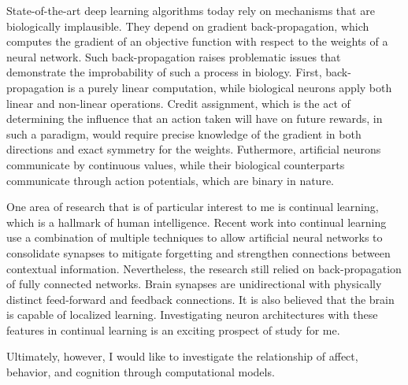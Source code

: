 \documentclass[12pt]{article}
\begin{document}
State-of-the-art deep learning algorithms today rely on mechanisms that are
biologically implausible.  They depend on gradient back-propagation, which
computes the gradient of an objective function with respect to the weights of a
neural network.  Such back-propagation raises problematic issues that
demonstrate the improbability of such a process in biology.  First,
back-propagation is a purely linear computation, while biological neurons apply
both linear and non-linear operations. Credit assignment, which is the act of
determining the influence that an action taken will have on future rewards, in
such a paradigm, would require precise knowledge of the gradient in both
directions and exact symmetry for the weights.  Futhermore, artificial neurons
communicate by continuous values, while their biological counterparts
communicate through action potentials, which are binary in nature.  

One
area of research that is of particular interest to me is continual learning, which is a
hallmark of human intelligence.  Recent work into continual learning use a
combination of multiple techniques to allow artificial neural networks to
consolidate synapses to mitigate forgetting and strengthen connections between
contextual information.  Nevertheless, the research still relied on
back-propagation of fully connected networks.  Brain synapses are unidirectional
with physically distinct feed-forward and feedback connections. It is also
believed that the brain is capable of localized learning. Investigating neuron
architectures with these features in continual learning is an exciting prospect
of study for me.

Ultimately, however, I would like to investigate the relationship of affect, behavior, and cognition through computational models.
\end{document}
